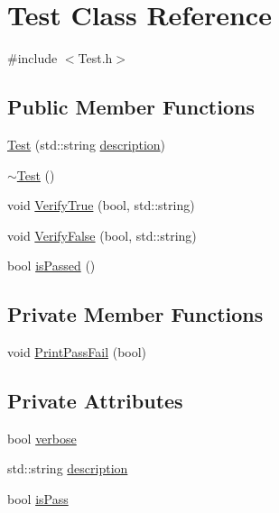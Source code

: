 \hypertarget{classTest}{\section{Test Class Reference}
\label{classTest}
}


{\ttfamily \#include $<$Test.\-h$>$}

\subsection*{Public Member Functions}
\begin{DoxyCompactItemize}
\item 
\hyperlink{classTest_aa1a8488c06a34269437ee3d97819d619}{Test} (std\-::string \hyperlink{classTest_a9452136cd882a23b8e52f5b2a82a5bb3}{description})
\item 
\hyperlink{classTest_a2b0a62f1e667bbe8d8cb18d785bfa991}{$\sim$\-Test} ()
\item 
void \hyperlink{classTest_aa7b8f1adb896473e046835503af76c1d}{Verify\-True} (bool, std\-::string)
\item 
void \hyperlink{classTest_a719a8eb78ad30689d4b1292d8ed8c6e0}{Verify\-False} (bool, std\-::string)
\item 
bool \hyperlink{classTest_ae10143e79951d45bd6137ed399d7b37a}{is\-Passed} ()
\end{DoxyCompactItemize}
\subsection*{Private Member Functions}
\begin{DoxyCompactItemize}
\item 
void \hyperlink{classTest_a260fb2b7ed4b913d8e205aa097e7bf18}{Print\-Pass\-Fail} (bool)
\end{DoxyCompactItemize}
\subsection*{Private Attributes}
\begin{DoxyCompactItemize}
\item 
bool \hyperlink{classTest_ab02c0c474b2a636c948baf761df0b3c5}{verbose}
\item 
std\-::string \hyperlink{classTest_a9452136cd882a23b8e52f5b2a82a5bb3}{description}
\item 
bool \hyperlink{classTest_a91d1d78671cfc2b974b6ae3c8a88f25d}{is\-Pass}
\end{DoxyCompactItemize}


